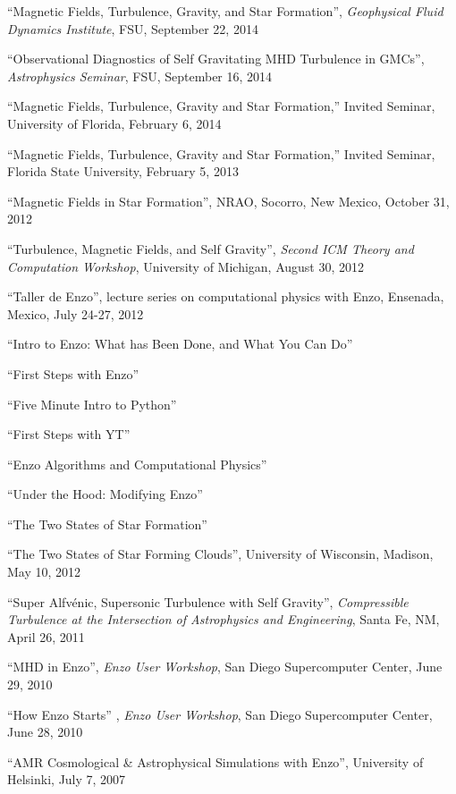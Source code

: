 \medskip
\noindent
``Magnetic Fields, Turbulence, Gravity, and Star Formation'',
{\it Geophysical Fluid Dynamics Institute}, FSU,  September 22, 2014

\medskip
\noindent
``Observational Diagnostics of Self Gravitating MHD Turbulence in GMCs'',
{\it Astrophysics Seminar}, FSU,  September 16, 2014

\medskip
\noindent
``Magnetic Fields, Turbulence, Gravity and Star Formation,'' Invited Seminar,
University of Florida, February 6, 2014

\medskip
\noindent
``Magnetic Fields, Turbulence, Gravity and Star Formation,'' Invited Seminar, Florida
State University, February 5, 2013 

\medskip
\noindent
``Magnetic Fields in Star Formation'', NRAO, Socorro, New Mexico, October 31,
2012

\medskip
\noindent
``Turbulence, Magnetic Fields, and Self Gravity'', {\it Second ICM Theory and
Computation Workshop}, University of Michigan, August 30, 2012

\medskip
\noindent
``Taller de Enzo'',  lecture series on computational physics
with Enzo, Ensenada, Mexico, July 24-27, 2012

``Intro to Enzo: What has Been Done, and What You Can Do''

``First Steps with Enzo''

``Five Minute Intro to Python''

``First Steps with YT''

``Enzo Algorithms and Computational Physics''

``Under the Hood: Modifying Enzo''

``The Two States of Star Formation''

\medskip
\noindent
``The Two States of Star Forming Clouds'', University of Wisconsin,
Madison, May 10, 2012

\medskip
\noindent
``Super Alfv\' enic, Supersonic Turbulence with Self Gravity'',  {\it
Compressible Turbulence at the Intersection of Astrophysics and Engineering},  Santa
Fe, NM, April 26, 2011

\medskip
\noindent
``MHD in Enzo'', {\it Enzo User Workshop},  San Diego Supercomputer Center,
June 29,  2010 

\medskip
\noindent
``How Enzo Starts'' , {\it Enzo User Workshop}, San Diego Supercomputer
Center, June 28, 2010

\medskip
\noindent
``AMR Cosmological \& Astrophysical Simulations with Enzo'', University of
Helsinki, July 7, 2007

